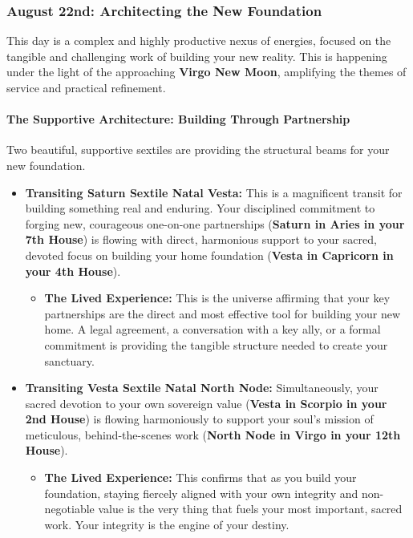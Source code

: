 \documentclass{article}
\begin{document}
\subsubsection*{August 22nd: Architecting the New Foundation}\label{august-22nd-architecting-the-new-foundation}

This day is a complex and highly productive nexus of energies, focused on the tangible and challenging work of building your new reality. This is happening under the light of the approaching \textbf{Virgo New Moon}, amplifying the themes of service and practical refinement.

\paragraph*{The Supportive Architecture: Building Through Partnership}\label{the-supportive-architecture-building-through-partnership}

Two beautiful, supportive sextiles are providing the structural beams for your new foundation.

\begin{itemize}
\tightlist
\item
  \textbf{Transiting Saturn Sextile Natal Vesta:} This is a magnificent transit for building something real and enduring. Your disciplined commitment to forging new, courageous one-on-one partnerships (\textbf{Saturn in Aries in your 7th House}) is flowing with direct, harmonious support to your sacred, devoted focus on building your home foundation (\textbf{Vesta in Capricorn in your 4th House}).

  \begin{itemize}
  \tightlist
  \item
    \textbf{The Lived Experience:} This is the universe affirming that your key partnerships are the direct and most effective tool for building your new home. A legal agreement, a conversation with a key ally, or a formal commitment is providing the tangible structure needed to create your sanctuary.
  \end{itemize}
\item
  \textbf{Transiting Vesta Sextile Natal North Node:} Simultaneously, your sacred devotion to your own sovereign value (\textbf{Vesta in Scorpio in your 2nd House}) is flowing harmoniously to support your soul's mission of meticulous, behind-the-scenes work (\textbf{North Node in Virgo in your 12th House}).

  \begin{itemize}
  \tightlist
  \item
    \textbf{The Lived Experience:} This confirms that as you build your foundation, staying fiercely aligned with your own integrity and non-negotiable value is the very thing that fuels your most important, sacred work. Your integrity is the engine of your destiny.
  \end{itemize}
\end{itemize}
\end{document}

